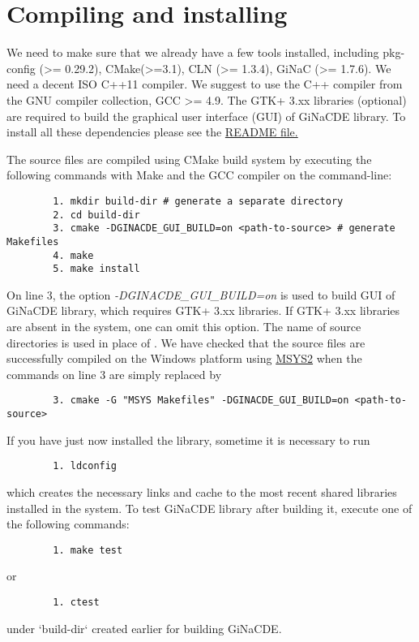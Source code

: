 \documentclass[prd,aps,floats,showkeys,nofootinbib,notitlepage]{revtex4-2}
\begin{document}
	
	\section{Compiling and installing}\label{sec:compile}
	We need to make sure that we already have a few tools installed, including pkg-config (>= 0.29.2), CMake(>=3.1), CLN (>= 1.3.4), GiNaC (>= 1.7.6). We need a decent ISO C++11 compiler. We suggest to use the C++ compiler from the GNU compiler collection, GCC >= 4.9. The GTK+ 3.xx libraries (optional) are required to build the graphical user interface (GUI) of GiNaCDE library. To install all these dependencies please see the \href{https://github.com/mithun218/GiNaCDE/tree/master#readme}{README file.} 
	
	The source files are compiled using CMake build system by executing the following commands with Make and the GCC compiler on the command-line:
	\begin{verbatim}
		1. mkdir build-dir # generate a separate directory
		2. cd build-dir
		3. cmake -DGINACDE_GUI_BUILD=on <path-to-source> # generate Makefiles
		4. make
		5. make install
	\end{verbatim}
	On line 3, the option {\em -DGINACDE\_GUI\_BUILD=on} is used to build GUI of GiNaCDE library, which requires GTK+ 3.xx libraries. If GTK+ 3.xx libraries are absent in the system, one can omit this option. The name of source directories is used in place of {\em <path-to-source>}. We have checked that the source files are successfully compiled on the Windows platform using \href{https://www.msys2.org}{MSYS2} when the commands on line 3 are simply replaced by
	\begin{verbatim}
		3. cmake -G "MSYS Makefiles" -DGINACDE_GUI_BUILD=on <path-to-source>
	\end{verbatim}
	If you have just now installed the library, sometime it is necessary to run
	\begin{verbatim}
		1. ldconfig
	\end{verbatim}
	which creates the necessary links and cache to the most recent shared libraries installed in the system.
	To test GiNaCDE library after building it, execute one of the following commands:
	\begin{verbatim}
		1. make test
	\end{verbatim}
	or
	\begin{verbatim}
		1. ctest
	\end{verbatim}
	under `build-dir` created earlier for building GiNaCDE.
	
\end{document}
